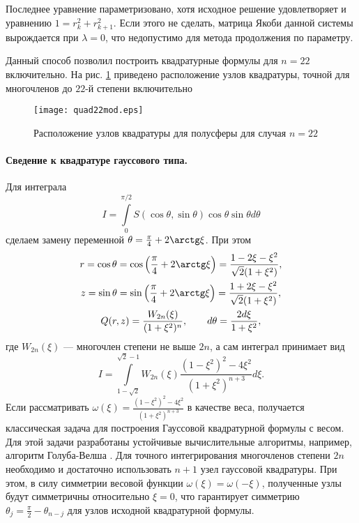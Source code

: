 Последнее уравнение параметризовано, хотя исходное решение удовлетворяет и уравнению $1 = r_{k}^2+r_{k+1}^2$. Если этого не сделать, матрица Якоби
данной системы вырождается при $\lambda = 0$, что недопустимо для метода продолжения по параметру.

Данный способ позволил построить квадратурные формулы для $n = 22$ включительно. На рис. \ref{fig:quad22} приведено расположение узлов квадратуры, точной для многочленов до $22$-й степени включительно
\begin{figure}[ht!]
\centering
\texttt{[image: quad22mod.eps]}
\caption{Расположение узлов квадратуры для полусферы для случая $n = 22$}
\label{fig:quad22}
\end{figure}

\paragraph{Сведение к квадратуре гауссового типа.} Для интеграла
\[
I = \int\limits_0^{\pi/2} S(\cos \theta, \sin \theta) \cos \theta \sin \theta d\theta
\]
сделаем замену переменной $\theta = \frac{\pi}{4} + 2 \arctg \xi$. При этом
\begin{gather*}
r = \cos \theta = \cos \left(\frac{\pi}{4} + 2 \arctg \xi\right) = \frac{1 - 2 \xi - \xi^2}{\sqrt{2}(1 + \xi^2)},\\
z = \sin \theta = \sin \left(\frac{\pi}{4} + 2 \arctg \xi\right) = \frac{1 + 2 \xi - \xi^2}{\sqrt{2}(1 + \xi^2)},\\
Q(r, z) = \frac{W_{2n}(\xi)}{(1 + \xi^2)^n},\qquad d\theta = \frac{2d\xi}{1 + \xi^2},
\end{gather*}
где $W_{2n}(\xi)$ --- многочлен степени не выше $2n$, а сам интеграл принимает вид
\[
I = \int\limits_{1-\sqrt{2}}^{\sqrt{2} - 1}
W_{2n}(\xi) \frac{(1 - \xi^2)^2 - 4\xi^2}{(1 + \xi^2)^{n+3}} d\xi.
\]
Если рассматривать $\omega(\xi) = \frac{(1 - \xi^2)^2 - 4\xi^2}{(1 + \xi^2)^{n+3}} $ в качестве веса, получается классическая задача для построения Гауссовой квадратурной формулы с весом. Для этой задачи разработаны устойчивые вычислительные алгоритмы, например, алгоритм Голуба-Велша \cite{Golub1969}.
Для точного интегрирования многочленов степени $2n$ необходимо и достаточно использовать $n+1$ узел гауссовой квадратуры.
При этом, в силу симметрии весовой функции $\omega(\xi) = \omega(-\xi)$, полученные узлы будут симметричны относительно $\xi = 0$, что гарантирует симметрию $\theta_j = \frac{\pi}{2} - \theta_{n - j}$ для узлов исходной квадратурной формулы.

